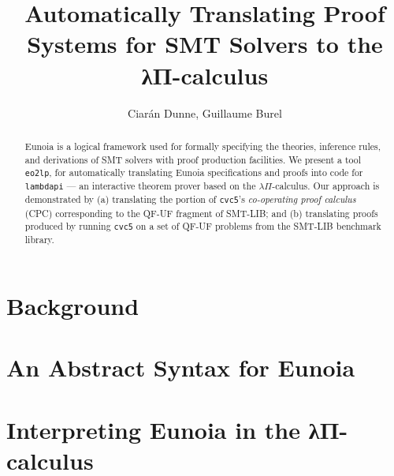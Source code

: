 \documentclass{llncs}
\title{%
	Automatically Translating Proof Systems
	for SMT Solvers to the λΠ-calculus}
\author{Ciarán Dunne, Guillaume Burel}
\institute{INRIA, ENS Paris-Saclay}
\begin{document}
\maketitle

\begin{abstract}
	\noindent
	Eunoia is a logical framework used for formally specifying the
	theories, inference rules, and derivations of SMT solvers with
	proof production facilities.
	We present a tool \texttt{eo2lp}, for automatically translating Eunoia
	specifications and proofs into code for \texttt{lambdapi} ---
	an interactive theorem prover based on the $\lambda\Pi$-calculus.
	Our approach is demonstrated by
	(a) translating the portion of \texttt{cvc5}'s
	\textit{co-operating proof calculus} (CPC) corresponding to the QF-UF
	fragment of SMT-LIB; and
	(b) translating proofs produced by running \texttt{cvc5} on a set of
	QF-UF problems from the SMT-LIB benchmark library.
\end{abstract}

\section{Background}


\section{An Abstract Syntax for Eunoia}


\section{Interpreting Eunoia in the λΠ-calculus}


\printbibliography
\end{document}
